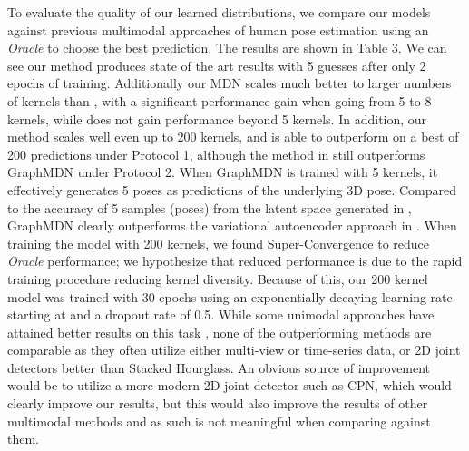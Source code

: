 To evaluate the quality of our learned distributions, we compare our models against previous multimodal approaches of human pose estimation \cite{jahangiri2017generating, Li_2019_CVPR,Sharma_2019_ICCV} using an \textit{Oracle} to choose the best prediction. The results are shown in Table 3. We can see our method produces state of the art results with 5 guesses after only 2 epochs of training. Additionally our MDN scales much better to larger numbers of kernels than \cite{Li_2019_CVPR}, with a significant performance gain when going from 5 to 8 kernels, while \cite{Li_2019_CVPR} does not gain performance beyond 5 kernels. In addition, our method scales well even up to 200 kernels, and is able to outperform \cite{Sharma_2019_ICCV} on a best of 200 predictions under Protocol 1, although the method in \cite{Sharma_2019_ICCV}
still outperforms GraphMDN under Protocol 2. When GraphMDN is trained with 5 kernels, it effectively generates 5 poses as predictions of the underlying 3D pose. Compared to the accuracy of 5 samples (poses) from the latent space generated in \cite{Sharma_2019_ICCV}, GraphMDN clearly outperforms the variational autoencoder approach in \cite{Sharma_2019_ICCV}. When training the model with 200 kernels, we found Super-Convergence to reduce \textit{Oracle} performance; we hypothesize that reduced performance is due to the rapid training procedure reducing kernel diversity. Because of this, our 200 kernel model was trained with 30 epochs using an exponentially decaying learning rate starting at  and a dropout rate of 0.5. While some unimodal approaches have attained better results on this task \cite{Iskakov_triangulation, pavllo20193d, Qiu_2019_ICCV}, none of the outperforming methods are comparable as they often utilize either multi-view or time-series data, or 2D joint detectors better than Stacked Hourglass. An obvious source of improvement would be to utilize a more modern 2D joint detector such as CPN\cite{pavllo20193d}, which would clearly improve our results, but this would also improve the results of other multimodal methods and as such is not meaningful when comparing against them.

